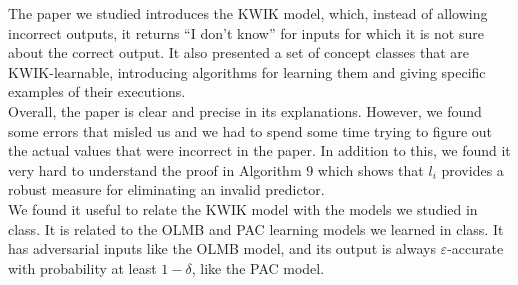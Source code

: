 The paper we studied introduces the KWIK model, which, instead of allowing
incorrect outputs, it returns ``I don't know'' for inputs for which it is not
sure about the correct output. It also presented a set of concept classes that
are KWIK-learnable, introducing algorithms for learning them and giving
specific examples of their executions. \\

Overall, the paper is clear and precise in its explanations. However, we found
some errors that misled us and we had to spend some time trying to figure out
the actual values that were incorrect in the paper. In addition to this, we
found it very hard to understand the proof in Algorithm 9 which shows that $l_i$
provides a robust measure for eliminating an invalid predictor. \\

We found it useful to relate the KWIK model with the models we studied in class.
It is related to the OLMB and PAC learning models we learned in class. It has
adversarial inputs like the OLMB model, and its output is always
$\varepsilon$-accurate with probability at least $1 - \delta$, like the PAC
model. \\
